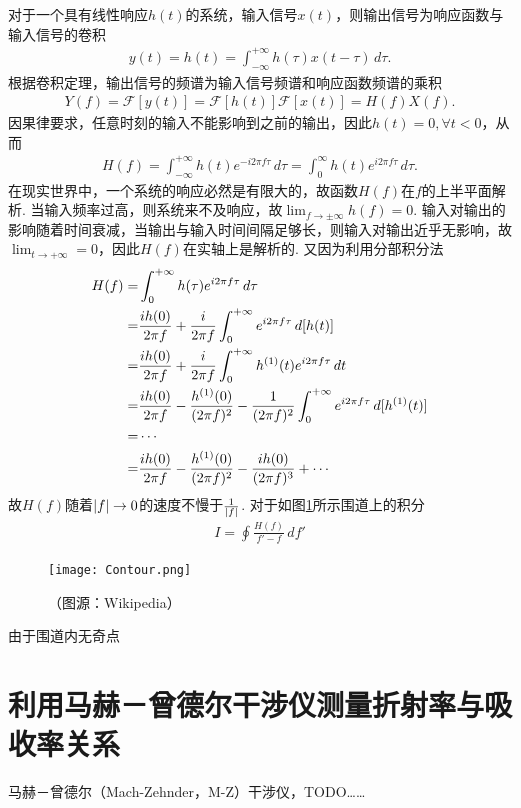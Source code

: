 \documentclass{assignment}
\begin{document}
对于一个具有线性响应$h(t)$的系统，输入信号$x(t)$，则输出信号为响应函数与输入信号的卷积
\begin{align}
    y(t)=h(t)=\int_{-\infty}^{+\infty}h(\tau)x(t-\tau)\,d\tau.
\end{align}
根据卷积定理，输出信号的频谱为输入信号频谱和响应函数频谱的乘积
\begin{align}
    Y(f)=\mathscr{F}[y(t)]=\mathscr{F}[h(t)]\mathscr{F}[x(t)]=H(f)X(f).
\end{align}
因果律要求，任意时刻的输入不能影响到之前的输出，因此$h(t)=0,\forall t<0$，从而
\begin{align}
    H(f)=\int_{-\infty}^{+\infty}h(t)e^{-i2\pi f\tau}\,d\tau=\int_0^{\infty}h(t)e^{i2\pi f\tau}\,d\tau.
\end{align}
在现实世界中，一个系统的响应必然是有限大的，故函数$H(f)$在$f$的上半平面解析. 当输入频率过高，则系统来不及响应，故$\lim_{f\rightarrow\pm\infty}h(f)=0$. 输入对输出的影响随着时间衰减，当输出与输入时间间隔足够长，则输入对输出近乎无影响，故$\lim_{t\rightarrow+\infty}=0$，因此$H(f)$在实轴上是解析的. 又因为利用分部积分法
\begin{align}
    \notag H(f)=&\int_0^{+\infty}h(\tau)e^{i2\pi f\tau}\,d\tau\\
    \notag=&\frac{ih(0)}{2\pi f}+\frac{i}{2\pi f}\int_0^{+\infty}e^{i2\pi f\tau}\,d[h(t)]\\
    \notag=&\frac{ih(0)}{2\pi f}+\frac{i}{2\pi f}\int_0^{+\infty}h^{(1)}(t)e^{i2\pi f\tau}\,dt\\
    \notag=&\frac{ih(0)}{2\pi f}-\frac{h^{(1)}(0)}{(2\pi f)^2}-\frac{1}{(2\pi f)^2}\int_0^{+\infty}e^{i2\pi f\tau}\,d[h^{(1)}(t)]\\
    \notag=&\cdots\\
    \notag=&\frac{ih(0)}{2\pi f}-\frac{h^{(1)}(0)}{(2\pi f)^2}-\frac{ih(0)}{(2\pi f)^3}+\cdots
\end{align}
故$H(f)$随着$\left\lvert f\right\rvert\rightarrow 0$的速度不慢于$\frac{1}{\left\lvert f\right\rvert}$. 对于如图\ref{contour}所示围道上的积分
\begin{align}
    I=\oint\frac{H(f)}{f'-f}\,df'
\end{align}
\begin{figure}[h]
    \centering
    \texttt{[image: Contour.png]}
    \caption{（图源：Wikipedia）}
    \label{contour}
\end{figure}
由于围道内无奇点

\section{利用马赫－曾德尔干涉仪测量折射率与吸收率关系}
马赫－曾德尔（Mach-Zehnder，M-Z）干涉仪，TODO……
\end{document}
